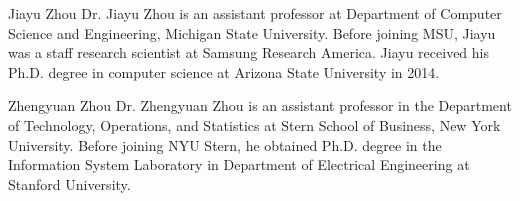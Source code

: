\documentclass[journal]{IEEEtran}
\begin{document}
\begin{IEEEbiography}{Jiayu Zhou}
Dr. Jiayu Zhou is an assistant professor at
 Department of Computer Science and Engineering, Michigan State University.
 Before joining MSU, Jiayu was a staff research scientist at Samsung Research
 America. Jiayu received his Ph.D. degree in computer science at Arizona
 State University in 2014. 
\end{IEEEbiography}

\begin{IEEEbiography}{Zhengyuan Zhou}
Dr. Zhengyuan Zhou is an assistant professor in the Department of Technology, Operations, and Statistics at Stern School of Business, New York University. Before joining NYU Stern, he obtained Ph.D. degree in the Information System Laboratory in Department of Electrical Engineering at Stanford University. 
\end{IEEEbiography}






\appendices







\ifCLASSOPTIONcaptionsoff
  \newpage
\fi




% 







\end{document}
